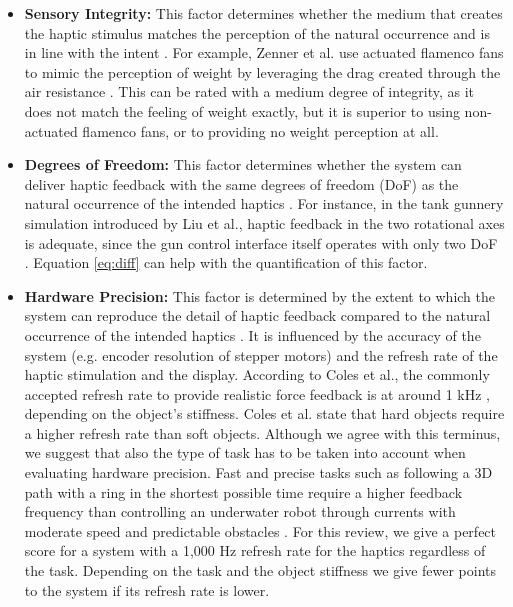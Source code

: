 \begin{itemize}
    \item \textbf{Sensory Integrity:}
    This factor determines whether the medium that creates the haptic stimulus matches the perception of the natural occurrence and is in line with the intent \cite{Muender2022HapticReality}. For example, Zenner et al. use actuated flamenco fans to mimic the perception of weight by leveraging the drag created through the air resistance \cite{Zenner2019}. This can be rated with a medium degree of integrity, as it does not match the feeling of weight exactly, but it is superior to using non-actuated flamenco fans, or to providing no weight perception at all.
    
    \item \textbf{Degrees of Freedom:}
    This factor determines whether the system can deliver haptic feedback with the same degrees of freedom (DoF) as the natural occurrence of the intended haptics \cite{Muender2022HapticReality}. For instance, in the tank gunnery simulation introduced by Liu et al., haptic feedback in the two rotational axes is adequate, since the gun control interface itself operates with only two DoF \cite{LiuG2014}. Equation \ref{eq:diff} can help with the quantification of this factor.
    
    \item \textbf{Hardware Precision:}
    This factor is determined by the extent to which the system can reproduce the detail of haptic feedback compared to the natural occurrence of the intended haptics \cite{Muender2022HapticReality}. 
    It is influenced by the accuracy of the system (e.g. encoder resolution of stepper motors) and the refresh rate of the haptic stimulation and the display. According to Coles et al., the commonly accepted refresh rate to provide realistic force feedback is at around 1 kHz \cite{Coles2011TheArt}, depending on the object's stiffness. Coles et al. state that hard objects require a higher refresh rate than soft objects. Although we agree with this terminus, we suggest that also the type of task has to be taken into account when evaluating hardware precision. Fast and precise tasks such as following a 3D path with a ring in the shortest possible time \cite{Oquendo2024} require a higher feedback frequency than controlling an underwater robot through currents with moderate speed and predictable obstacles \cite{Xia2023}.
    For this review, we give a perfect score for a system with a 1,000 Hz refresh rate for the haptics regardless of the task. Depending on the task and the object stiffness we give fewer points to the system if its refresh rate is lower.


\end{itemize}
